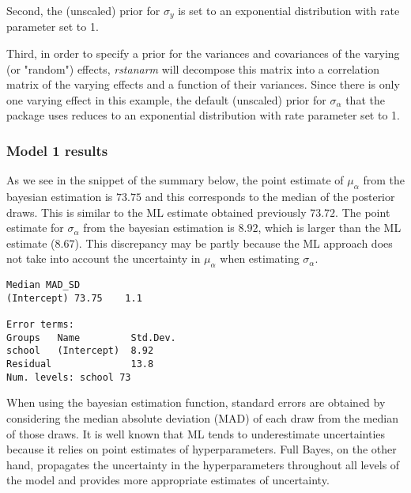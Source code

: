 Second, the (unscaled) prior for $\sigma_{y}$ is set to an exponential distribution with rate parameter set to 1.

Third, in order to specify a prior for the variances and covariances of the varying (or "random") effects, \textit{rstanarm} will decompose this matrix into a correlation matrix of the varying effects and a function of their variances.  Since there is only one varying effect in this example, the default (unscaled) prior for $\sigma_{\alpha}$ that the package uses reduces to an exponential distribution with rate parameter set to 1.

\subsubsection*{Model 1 results}  
As we see in the snippet of the summary below, the point estimate of $\mu_{\alpha}$ from the bayesian estimation is $73.75$ and this corresponds to the median of the posterior draws.  This is similar to the ML estimate obtained previously $73.72$.  The point estimate for $\sigma_{\alpha}$ from the bayesian estimation is $8.92$, which is larger than the ML estimate ($8.67$). This discrepancy may be partly because the ML approach does not take into account the uncertainty in $\mu_{\alpha}$ when estimating $\sigma_{\alpha}$.

\begin{Verbatim}[frame=single]
            Median MAD_SD
(Intercept) 73.75    1.1  

Error terms:
Groups   Name         Std.Dev.
school   (Intercept)  8.92    
Residual              13.8    
Num. levels: school 73 
\end{Verbatim}

When using the bayesian estimation function, standard errors are obtained by considering the median absolute deviation (MAD) of each draw from the median of those draws.  It is well known that ML tends to underestimate uncertainties because it relies on point estimates of hyperparameters. Full Bayes, on the other hand, propagates the uncertainty in the hyperparameters throughout all levels of the model and provides more appropriate estimates of uncertainty.

